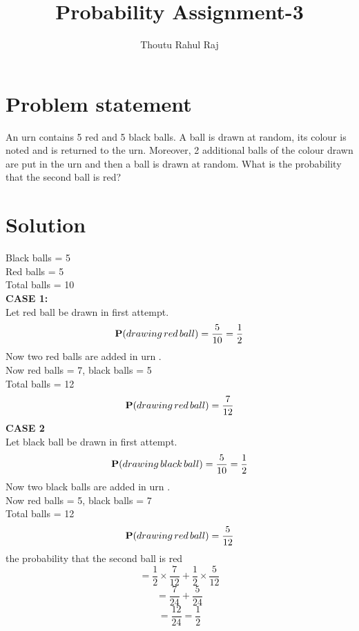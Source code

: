 \documentclass{article}
\title{Probability Assignment-3}
\author{Thoutu Rahul Raj}
\let\vec\mathbf
\begin{document}
\maketitle
\newtheorem{theorem}{Theorem}[section]
\section*{\large Problem statement}
An urn contains 5 red and 5 black balls. A ball is drawn at random, its colour is noted and is returned to the urn. Moreover, 2 additional balls of the colour drawn are put in the urn and then a ball is drawn at random. What is the probability that the second ball is red?
\section*{\large Solution}
Black balls = 5\\
Red balls = 5\\
Total balls = 10\\
\textbf{CASE 1:}\\
Let red ball be drawn in  first attempt.\\
\begin{equation}
\vec P(drawing\, red\, ball)=\frac{5}{10}=\frac{1}{2}\\
\end{equation}
Now two red balls are added in urn .\\
Now  red balls = 7, black balls = 5\\
Total balls = 12\\
\begin{equation}
\vec P(drawing\, red\, ball)=\frac{7}{12}\\
\end{equation}
\textbf{CASE 2}\\ 
Let black ball be drawn in  first attempt.\\
\begin{equation}
\vec P(drawing\, black\, ball)=\frac{5}{10}=\frac{1}{2}\\
\end{equation}
Now two black balls are added in urn .\\
Now  red balls = 5, black balls = 7\\
Total balls = 12\\
\begin{equation}
\vec P(drawing\, red\, ball)=\frac{5}{12}\\
\end{equation}
the probability that the second ball is red \\

\begin{equation}
=\frac{1}{2}\times \frac{7}{12}+\frac{1}{2}\times \frac{5}{12}
\end{equation}
\begin{equation}
= \frac{7}{24}+ \frac{5}{24}
\end{equation}
\begin{equation}
= \frac{12}{24}=\frac{1}{2}
\end{equation}
\end{document}
